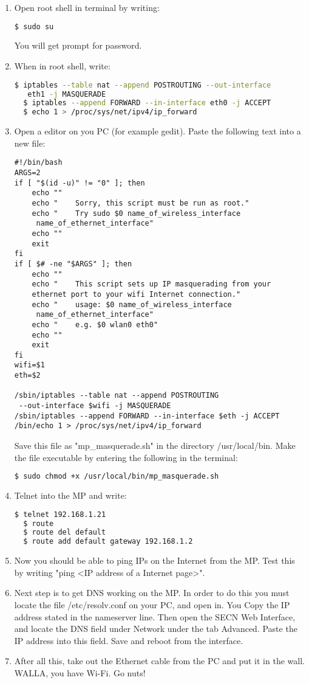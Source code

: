 \begin{enumerate}
\begin{lstlisting}[language=bash]
\end{lstlisting}
\item Open root shell in terminal by writing: 
\noindent
\begin{lstlisting}[language=bash]
  $ sudo su
\end{lstlisting}
You will get prompt for password. 
\item When in root shell, write: 
\noindent
\begin{lstlisting}[language=bash]
  $ iptables --table nat --append POSTROUTING --out-interface
   eth1 -j MASQUERADE
  $ iptables --append FORWARD --in-interface eth0 -j ACCEPT
  $ echo 1 > /proc/sys/net/ipv4/ip_forward
\end{lstlisting}
\item Open a editor on you PC (for example gedit). Paste the following text into a new file: 
\begin{framed}
\begin{verbatim}
#!/bin/bash
ARGS=2
if [ "$(id -u)" != "0" ]; then
    echo ""
    echo "    Sorry, this script must be run as root."
    echo "    Try sudo $0 name_of_wireless_interface
     name_of_ethernet_interface"
    echo ""
    exit
fi
if [ $# -ne "$ARGS" ]; then 
    echo ""
    echo "    This script sets up IP masquerading from your 
    ethernet port to your wifi Internet connection."
    echo "    usage: $0 name_of_wireless_interface
     name_of_ethernet_interface"
    echo "    e.g. $0 wlan0 eth0"
    echo ""
    exit
fi
wifi=$1
eth=$2

/sbin/iptables --table nat --append POSTROUTING
 --out-interface $wifi -j MASQUERADE
/sbin/iptables --append FORWARD --in-interface $eth -j ACCEPT
/bin/echo 1 > /proc/sys/net/ipv4/ip_forward
\end{verbatim}
\end{framed}

Save this file as "mp_masquerade.sh" in the directory /usr/local/bin. Make the file executable by entering the following in the terminal:
\noindent
\begin{lstlisting}[language=bash]
  $ sudo chmod +x /usr/local/bin/mp_masquerade.sh
\end{lstlisting}
\item Telnet into the MP and write:
\noindent
\begin{lstlisting}[language=bash]
  $ telnet 192.168.1.21
  $ route 
  $ route del default
  $ route add default gateway 192.168.1.2
\end{lstlisting}
\item Now you should be able to ping IPs on the Internet from the MP. Test this by writing "ping <IP address of a Internet page>". 
\item Next step is to get DNS working on the MP. In order to do this you must locate the file /etc/resolv.conf on your PC, and open in. You Copy the IP address stated in the nameserver line. Then open the SECN Web Interface, and locate the DNS field under Network under the tab Advanced. Paste the IP address into this field. Save and reboot from the interface. 
\item After all this, take out the Ethernet cable from the PC and put it in the wall. WALLA, you have Wi-Fi. Go nuts!
\end{enumerate}